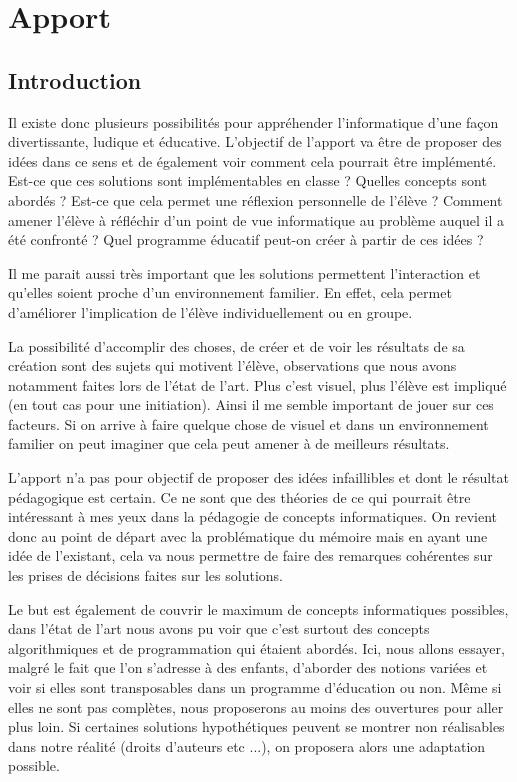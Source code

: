 \chapter{Apport}

\section{Introduction}

Il existe donc plusieurs possibilités pour appréhender l'informatique d'une façon divertissante, ludique et éducative. L'objectif de l'apport va être de proposer des idées dans ce sens et de également voir comment cela pourrait être implémenté. Est-ce que ces solutions sont implémentables en classe ? Quelles concepts sont abordés ? Est-ce que cela permet une réflexion personnelle de l'élève ? Comment amener l'élève à réfléchir d'un point de vue informatique au problème auquel il a été confronté ? Quel programme éducatif peut-on créer à partir de ces idées ?

Il me parait aussi très important que les solutions permettent l'interaction et qu'elles soient proche d'un environnement familier. En effet, cela permet d'améliorer l'implication de l'élève individuellement ou en groupe.

La possibilité d'accomplir des choses, de créer et de voir les résultats de sa création sont des sujets qui motivent l'élève, observations que nous avons notamment faites lors de l'état de l'art. Plus c'est visuel, plus l'élève est impliqué (en tout cas pour une initiation). Ainsi il me semble important de jouer sur ces facteurs. Si on arrive à faire quelque chose de visuel et dans un environnement familier on peut imaginer que cela peut amener à de meilleurs résultats.

L'apport n'a pas pour objectif de proposer des idées infaillibles et dont le résultat pédagogique est certain. Ce ne sont que des théories de ce qui pourrait être intéressant à mes yeux dans la pédagogie de concepts informatiques. On revient donc au point de départ avec la problématique du mémoire mais en ayant une idée de l'existant, cela va nous permettre de faire des remarques cohérentes sur les prises de décisions faites sur les solutions.

Le but est également de couvrir le maximum de concepts informatiques possibles, dans l'état de l'art nous avons pu voir que c'est surtout des concepts algorithmiques et de programmation qui étaient abordés. Ici, nous allons essayer, malgré le fait que l'on s'adresse à des enfants, d'aborder des notions variées et voir si elles sont transposables dans un programme d'éducation ou non. Même si elles ne sont pas complètes, nous proposerons au moins des ouvertures pour aller plus loin. Si certaines solutions hypothétiques peuvent se montrer non réalisables dans notre réalité (droits d'auteurs etc ...), on proposera alors une adaptation possible.

